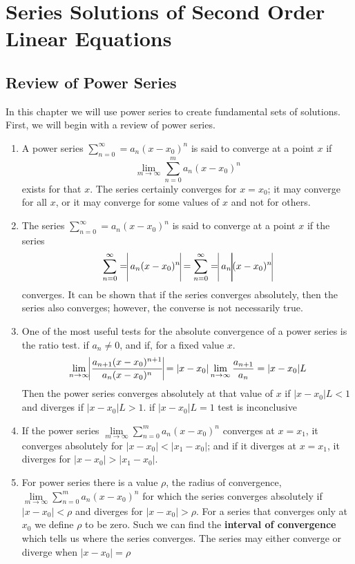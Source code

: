 \chapter{Series Solutions of Second Order Linear Equations}
\section{Review of Power Series}
	In this chapter we will use power series to create fundamental sets of solutions. First, we will begin with a review of power series. 
	
	\begin{enumerate}
		\item A power series $ \sum \limits_{n=0}^{\infty} = a_n(x-x_0)^n$ is said to converge at a point $ x $ if \[ \lim\limits_{m \rightarrow \infty} \sum \limits_{n=0}^m a_n (x-x_0)^n \] exists for that $ x $. The series certainly converges for $ x = x_0 $; it may converge for all $ x $, or it may converge for some values of $ x $ and not for others. 
		\item The series $ \sum \limits_{n=0}^{\infty} = a_n(x-x_0)^n$ is said to converge at a point $ x $ if the series 
		$$ \sum \limits_{n=0}^{\infty} =  \vline a_n(x-x_0)^n \vline = \sum \limits_{n=0}^{\infty} = \vline a_n \vline \vline (x-x_0)^n \vline $$ converges. It can be shown that if the series converges absolutely, then the series also converges; however, the converse is not necessarily true. 
		\item One of the most useful tests for the absolute convergence of a power series is the ratio test. if $ a_n \neq 0 $, and if, for a fixed value $ x $. \[ \lim_{n \rightarrow \infty} \vline \dfrac{a_{n+1}(x-x_0)^{n+1}}{a_n(x-x_0)^n} \vline = |x-x_0| \lim_{n \rightarrow \infty} \dfrac{a_{n+1}}{a_n} = |x-x_0|L\] Then the power series converges absolutely at that value of $ x $ if $ |x-x_0|L<1 $ and diverges if $ |x-x_0|L>1 $. if $ |x-x_0|L=1 $ test is inconclusive
		\item If the power series $ \lim\limits_{m \rightarrow \infty} \sum \limits_{n=0}^m a_n (x-x_0)^n $ converges at $ x = x_1 $, it converges absolutely for $ |x-x_0| < |x_1-x_0| $; and if it diverges at $ x = x_1 $, it diverges for $ |x-x_0| > |x_1-x_0| $.
		\item For power series there is a value $ \rho $, the radius of convergence, $ \lim\limits_{m \rightarrow \infty} \sum \limits_{n=0}^m a_n (x-x_0)^n $ for which the series converges absolutely if $ |x - x_0| < \rho $ and diverges for $ |x-x_0| > \rho $. For a series that converges only at $ x_0 $ we define $ \rho $ to be zero. Such we can find the \textbf{interval of convergence} which tells us where the series converges. The series may either converge or diverge when $ |x-x_0| = \rho $ 
		

\end{enumerate}
